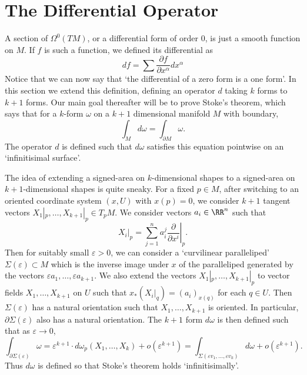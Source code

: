 \section{The Differential Operator}

A section of $\Omega^0(TM)$, or a differential form of order 0, is just a smooth function on $M$. If $f$ is such a function, we defined its differential as
%
\[ df = \sum \frac{\partial f}{\partial x^\alpha} dx^\alpha \]
%
Notice that we can now say that `the differential of a zero form is a one form'. In this section we extend this definition, defining an operator $d$ taking $k$ forms to $k+1$ forms. Our main goal thereafter will be to prove Stoke's theorem, which says that for a $k$-form $\omega$ on a $k+1$ dimensional manifold $M$ with boundary,
%
\[ \int_M d\omega = \int_{\partial M} \omega. \]
%
The operator $d$ is defined such that $d\omega$ satisfies this equation pointwise on an `infinitisimal surface'.

The idea of extending a signed-area on $k$-dimensional shapes to a signed-area on $k+1$-dimensional shapes is quite sneaky. For a fixed $p \in M$, after switching to an oriented coordinate system $(x,U)$ with $x(p) = 0$, we consider $k+1$ tangent vectors $X_1|_p, \dots, X_{k+1}|_p \in T_pM$. We consider vectors $a_i \in \RR^n$ such that
%
\[ X_i|_p = \sum_{j = 1}^n a_i^j \left. \frac{\partial}{\partial x^i} \right|_p. \]
%
Then for suitably small $\varepsilon > 0$, we can consider a `curvilinear paralleliped' $\Sigma(\varepsilon) \subset M$ which is the inverse image under $x$ of the paralleliped generated by the vectors $\varepsilon a_1, \dots, \varepsilon a_{k+1}$. We also extend the vectors $X_1|_p, \dots, X_{k+1}|_p$ to vector fields $X_1, \dots, X_{k+1}$ on $U$ such that $x_*(X_i|_q) = (a_i)_{x(q)}$ for each $q \in U$. Then $\Sigma(\varepsilon)$ has a natural orientation such that $X_1, \dots, X_{k+1}$ is oriented. In particular, $\partial \Sigma(\varepsilon)$ also has a natural orientation. The $k+1$ form $d\omega$ is then defined such that as $\varepsilon \to 0$,
%
\[ \int_{\partial \Sigma(\varepsilon)} \omega = \varepsilon^{k+1} \cdot d\omega_p(X_1, \dots, X_k) + o(\varepsilon^{k+1}) = \int_{\Sigma(\varepsilon v_1, \dots, \varepsilon v_k)} d\omega + o(\varepsilon^{k+1}). \]
%
Thus $d\omega$ is defined so that Stoke's theorem holds `infinitisimally'.

